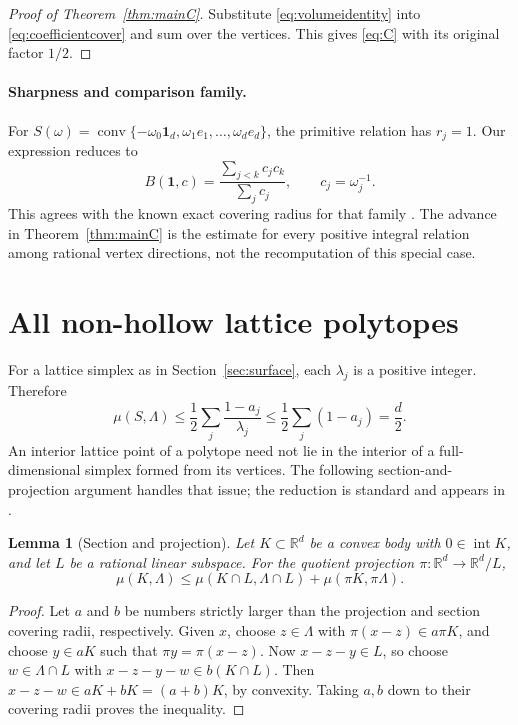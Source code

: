 \documentclass[11pt,a4paper]{article}
\newtheorem{lemma}[theorem]{Lemma}
\theoremstyle{definition}\newtheorem{definition}[theorem]{Definition}
\theoremstyle{remark}\newtheorem{remark}[theorem]{Remark}
\DeclareMathOperator{\conv}{conv}
\DeclareMathOperator{\inter}{int}
\newcommand{\R}{\mathbb R}\newcommand{\Z}{\mathbb Z}
\newcommand{\one}{\mathbf1}
\begin{document}
\begin{proof}[Proof of Theorem~\ref{thm:mainC}]
Substitute \eqref{eq:volumeidentity} into
\eqref{eq:coefficientcover} and sum over the vertices.
This gives \eqref{eq:C} with its original factor $1/2$.
\end{proof}

\paragraph{Sharpness and comparison family.}
For $S(\omega)=\conv\{-\omega_0\one_d,
\omega_1e_1,\ldots,\omega_de_d\}$, the primitive relation has
$r_j=1$. Our expression reduces to
\[
 B(\one,c)=\frac{\sum_{j<k}c_jc_k}{\sum_jc_j},
 \qquad c_j=\omega_j^{-1}.
\]
This agrees with the known exact covering radius for that family
\cite[Theorem 1.4]{CSS}. The advance in
Theorem~\ref{thm:mainC} is the estimate for every positive integral
relation among rational vertex directions, not the recomputation
of this special case.

\section{All non-hollow lattice polytopes}
\label{sec:polytope}
For a lattice simplex as in Section~\ref{sec:surface}, each
$\lambda_j$ is a positive integer. Therefore
\begin{equation}\label{eq:latticesimplex}
 \mu(S,\Lambda)\le\frac12\sum_j\frac{1-a_j}{\lambda_j}
 \le\frac12\sum_j(1-a_j)=\frac d2.
\end{equation}
An interior lattice point of a polytope need not lie in the interior
of a full-dimensional simplex formed from its vertices. The following
section-and-projection argument handles that issue; the reduction
is standard and appears in \cite[Lemma 2.1, Lemma 3.1 and
Corollary 3.2]{CSS}.

\begin{lemma}[Section and projection]\label{lem:section}
Let $K\subset\R^d$ be a convex body with $0\in\inter K$, and let
$L$ be a rational linear subspace. For the quotient projection
$\pi:\R^d\to\R^d/L$,
\[
 \mu(K,\Lambda)\le
 \mu(K\cap L,\Lambda\cap L)+\mu(\pi K,\pi\Lambda).
\]
\end{lemma}
\begin{proof}
Let $a$ and $b$ be numbers strictly larger than the projection and
section covering radii, respectively. Given $x$, choose $z\in\Lambda$
with $\pi(x-z)\in a\pi K$, and choose $y\in aK$ such that
$\pi y=\pi(x-z)$. Now $x-z-y\in L$, so choose
$w\in\Lambda\cap L$ with $x-z-y-w\in b(K\cap L)$.
Then $x-z-w\in aK+bK=(a+b)K$, by convexity. Taking $a,b$
down to their covering radii proves the inequality.
\end{proof}
\end{document}

